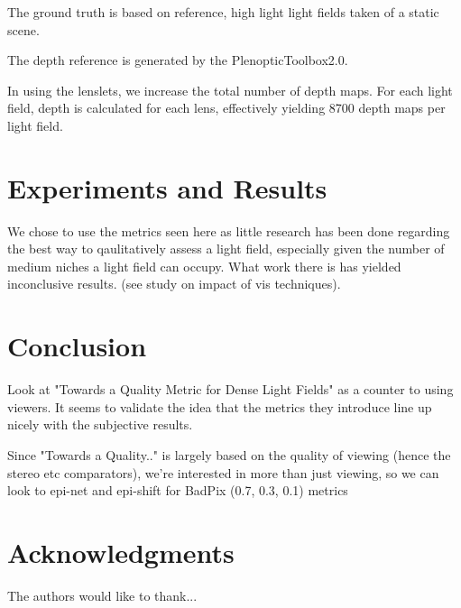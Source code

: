 \documentclass[10pt,journal,compsoc]{IEEEtran}
\newif\ifpeerreview
\begin{document}
The ground truth is based on reference, high light light fields taken of a static scene. 

The depth reference is generated by the PlenopticToolbox2.0.

In using the lenslets, we increase the total number of depth maps. For each light field, depth is calculated for each lens, effectively yielding 8700 depth maps per light field.

\section{Experiments and Results}
We chose to use the metrics seen here as little research has been done regarding the best way to qaulitatively assess a light field, especially given the number of medium niches a light field can occupy. What work there is has yielded inconclusive results. (see study on impact of vis techniques).

\section{Conclusion}

Look at "Towards a Quality Metric for Dense Light Fields" as a counter to using viewers. It seems to validate the idea that the metrics they introduce line up nicely with the subjective results. 

Since "Towards a Quality.." is largely based on the quality of viewing (hence the stereo etc comparators), we're interested in more than just viewing, so we can look to epi-net and epi-shift for BadPix (0.7, 0.3, 0.1) metrics



\ifpeerreview \else
\section*{Acknowledgments}
The authors would like to thank...
\fi
\end{document}
